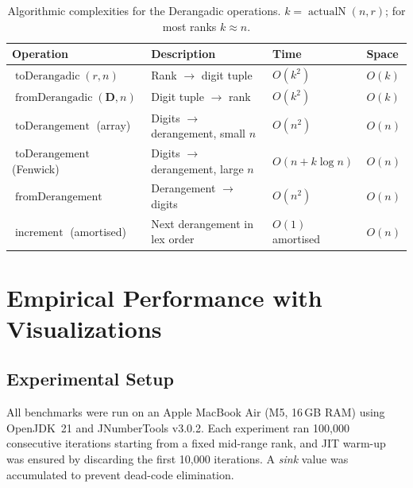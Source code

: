 \documentclass[11pt,a4paper]{article}
\newcommand{\actualN}{\operatorname{actualN}}
\begin{document}
    \begin{table}[h]
        \centering
        \caption{Algorithmic complexities for the Derangadic operations.
            $k = \actualN(n,r)$; for most ranks $k \approx n$.}
        \label{tab:complexity}
        \begin{tabular}{llll}
            \toprule
            Operation & Description & Time & Space \\
            \midrule
            $\operatorname{toDerangadic}(r,n)$
            & Rank $\to$ digit tuple
            & $O(k^2)$ & $O(k)$ \\
            $\operatorname{fromDerangadic}(\mathbf{D},n)$
            & Digit tuple $\to$ rank
            & $O(k^2)$ & $O(k)$ \\
            $\operatorname{toDerangement}$ (array)
            & Digits $\to$ derangement, small $n$
            & $O(n^2)$ & $O(n)$ \\
            $\operatorname{toDerangement}$ (Fenwick)
            & Digits $\to$ derangement, large $n$
            & $O(n + k \log n)$ & $O(n)$ \\
            $\operatorname{fromDerangement}$
            & Derangement $\to$ digits
            & $O(n^2)$ & $O(n)$ \\
            $\operatorname{increment}$ (amortised)
            & Next derangement in lex order
            & $O(1)$ amortised & $O(n)$ \\
            \bottomrule
        \end{tabular}
    \end{table}

    \section{Empirical Performance with Visualizations}
    \label{sec:performance}

    \subsection{Experimental Setup}
    All benchmarks were run on an Apple MacBook Air (M5, 16\,GB RAM) using
    OpenJDK~21 and JNumberTools v3.0.2. Each experiment ran 100,000
    consecutive iterations starting from a fixed mid-range rank, and JIT
    warm-up was ensured by discarding the first 10,000 iterations. A
    \emph{sink} value was accumulated to prevent dead-code elimination.
\end{document}
